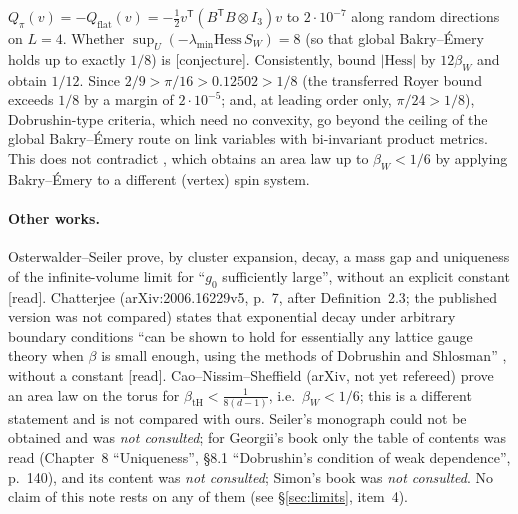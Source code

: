 \documentclass[11pt,a4paper]{article}
\theoremstyle{remark}
\theoremstyle{definition}
\newcommand{\st}[1]{\textsf{[#1]}}
\begin{document}
$Q_\pi(v)=-Q_{\text{flat}}(v)=-\frac12v^{\mathsf T}(B^{\mathsf T}B\otimes I_3)v$ to $2\cdot10^{-7}$ along random directions
on $L=4$. Whether $\sup_U(-\lambda_{\min}\mathrm{Hess}\,S_W)=8$ (so that global Bakry--\'Emery holds up to exactly
$1/8$) is \st{conjecture}. Consistently, \cite{SZZ23} bound $|\mathrm{Hess}|$ by $12\beta_W$ and obtain $1/12$.
Since $2/9>\pi/16>0.12502>1/8$ (the transferred Royer bound exceeds $1/8$ by a margin of $2\cdot10^{-5}$; and,
at leading order only, $\pi/24>1/8$), Dobrushin-type criteria, which need no convexity, go beyond the ceiling of
the global Bakry--\'Emery route on link variables with bi-invariant product metrics. This does not contradict
\cite{CNS25}, which obtains an area law up to $\beta_W<1/6$ by applying Bakry--\'Emery to a different (vertex)
spin system.

\paragraph{Other works.} Osterwalder--Seiler \cite{OS78} prove, by cluster expansion, decay, a mass gap and
uniqueness of the infinite-volume limit for ``$g_0$ sufficiently large'', without an explicit constant
\st{read}. Chatterjee \cite{Cha21} (arXiv:2006.16229v5, p.~7, after Definition~2.3; the published version was not
compared) states that exponential decay under arbitrary boundary conditions ``can be shown to hold for
essentially any lattice gauge theory when $\beta$ is small enough, using the methods of Dobrushin and Shlosman''
\cite{DS85}, without a constant \st{read}. Cao--Nissim--Sheffield
\cite{CNS25} (arXiv, not yet refereed) prove an area law on the torus for $\beta_{\mathrm{tH}}<\frac1{8(d-1)}$,
i.e.\ $\beta_W<1/6$; this is a different statement and is not compared with ours.
Seiler's monograph \cite{Sei82} could not be obtained and was \emph{not consulted}; for Georgii's book
\cite{Geo88} only the table of contents was read (Chapter~8 ``Uniqueness'', \S8.1 ``Dobrushin's condition of
weak dependence'', p.~140), and its content was \emph{not consulted}; Simon's book \cite{Sim93} was \emph{not
consulted}. No claim of this note rests on any of them (see \S\ref{sec:limits}, item~4).
\end{document}

